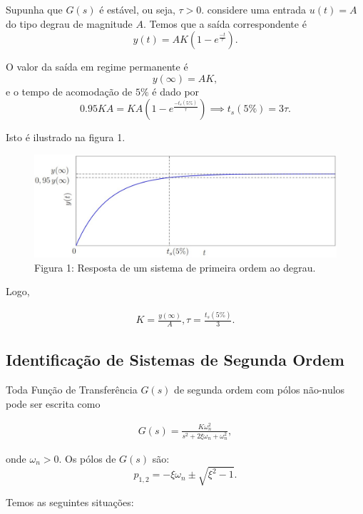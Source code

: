 \documentclass[
]{book}
\begin{document}
Supunha que \(G(s)\) é estável, ou seja, \(\tau > 0\). considere uma entrada \(u(t) = A\) do tipo degrau de magnitude \(A\). Temos que a saída correspondente é
\[
y(t) = AK(1- e^{\frac {-t}{\tau}}).
\]

O valor da saída em regime permanente é
\[
y(\infty) = AK,
\]
e o tempo de acomodação de \(5\%\) é dado por
\[
0.95KA = KA(1- e^{\frac {-t_s(5\%)}{\tau}}) \implies t_s(5\%) =3 \tau.
\]

Isto é ilustrado na figura 1.

\begin{figure}
\centering
\includegraphics{Imagens/Lab3/Explicação/fig1.jpg}
\caption{Figura 1: Resposta de um sistema de primeira ordem ao degrau.}
\end{figure}

Logo,

\begin{align}
K = \frac{y(\infty)}{A},  \tau = \frac {t_s(5\%)}{3}. \label{eq:eq2}
\end{align}

\hypertarget{identificauxe7uxe3o-de-sistemas-de-segunda-ordem}{%
\subsection{Identificação de Sistemas de Segunda Ordem}\label{identificauxe7uxe3o-de-sistemas-de-segunda-ordem}}

Toda Função de Transferência \(G(s)\) de segunda ordem com pólos não-nulos pode ser escrita como

\begin{align}
G(s) = \frac {K \omega_n^2}{s^2+2\xi \omega_n+ \omega_n^2}, \label{eq:eq3}
\end{align}

onde \(\omega_n > 0\). Os pólos de \(G(s)\) são:
\[
p_{1,2} = - \xi \omega_n \pm \sqrt{\xi^2 -1}.
\]

Temos as seguintes situações:
\end{document}
